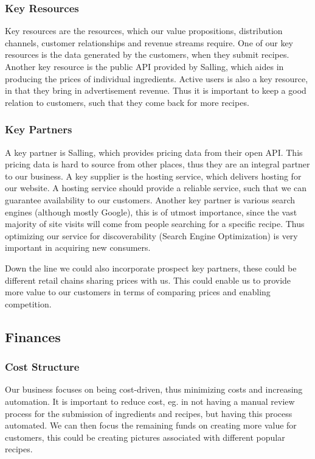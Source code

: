 \documentclass{article}
\begin{document}
\subsubsection{Key Resources}
Key resources are the resources, which our value propositions, distribution channels,  
customer relationships and revenue streams require. One of our key resources is the data
generated by the customers, when they submit recipes. Another key resource is the public
API provided by Salling, which aides in producing the prices of individual ingredients.
Active users is also a key resource, in that they bring in advertisement revenue. Thus it
is important to keep a good relation to customers, such that they come back for more
recipes.

\subsubsection{Key Partners}
A key partner is Salling, which provides pricing data from their open API. This pricing
data is hard to source from other places, thus they are an integral partner to our
business. A key supplier
is the hosting service, which delivers hosting for our website. A hosting service should
provide a reliable service, such that we can guarantee availability to our customers.
Another key partner is various search engines (although mostly Google), this is of utmost
importance, since the vast majority of site visits will come from people searching for a
specific recipe. Thus optimizing our service for discoverability (Search Engine
Optimization) is very important in acquiring new consumers.

Down the line we could also incorporate prospect key partners, these could be different
retail chains sharing prices with us. This could enable us to provide more value to our
customers in terms of comparing prices and enabling competition.

\subsection{Finances}

\subsubsection{Cost Structure}
Our business focuses on being cost-driven, thus minimizing costs and increasing
automation. It is important to reduce cost, eg. in not having a manual review process for
the submission of ingredients and recipes, but having this process automated. We can then
focus the remaining funds on creating more value for customers, this could be creating
pictures associated with different popular recipes.
\end{document}
